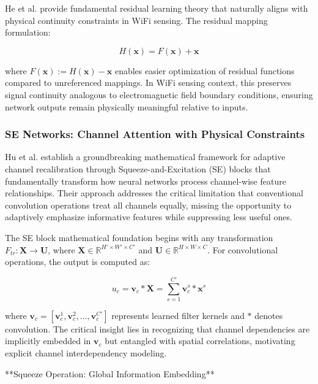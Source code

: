 \documentclass[journal]{IEEEtran}
\begin{document}
{He et al. \cite{he2016deep} provide fundamental residual learning theory that naturally aligns with physical continuity constraints in WiFi sensing. The residual mapping formulation:

\begin{equation}
H(\mathbf{x}) = F(\mathbf{x}) + \mathbf{x}
\label{eq:resnet_residual}
\end{equation}

where $F(\mathbf{x}) := H(\mathbf{x}) - \mathbf{x}$ enables easier optimization of residual functions compared to unreferenced mappings. In WiFi sensing context, this preserves signal continuity analogous to electromagnetic field boundary conditions, ensuring network outputs remain physically meaningful relative to inputs.

\subsubsection{SE Networks: Channel Attention with Physical Constraints}

Hu et al. \cite{hu2018squeeze} establish a groundbreaking mathematical framework for adaptive channel recalibration through Squeeze-and-Excitation (SE) blocks that fundamentally transform how neural networks process channel-wise feature relationships. Their approach addresses the critical limitation that conventional convolution operations treat all channels equally, missing the opportunity to adaptively emphasize informative features while suppressing less useful ones.

The SE block mathematical foundation begins with any transformation $F_{tr}: \mathbf{X} \rightarrow \mathbf{U}$, where $\mathbf{X} \in \mathbb{R}^{H' \times W' \times C'}$ and $\mathbf{U} \in \mathbb{R}^{H \times W \times C}$. For convolutional operations, the output is computed as:

\begin{equation}
u_c = \mathbf{v}_c * \mathbf{X} = \sum_{s=1}^{C'} \mathbf{v}_c^s * \mathbf{x}^s
\label{eq:se_convolution}
\end{equation}

where $\mathbf{v}_c = [\mathbf{v}_c^1, \mathbf{v}_c^2, \ldots, \mathbf{v}_c^{C'}]$ represents learned filter kernels and $*$ denotes convolution. The critical insight lies in recognizing that channel dependencies are implicitly embedded in $\mathbf{v}_c$ but entangled with spatial correlations, motivating explicit channel interdependency modeling.

**Squeeze Operation: Global Information Embedding**

}
\end{document}
